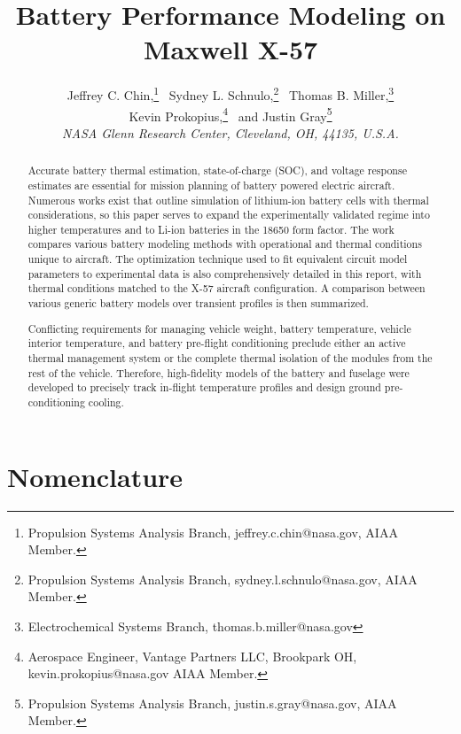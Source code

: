 \documentclass[]{aiaa-tc}%
\title{Battery Performance Modeling on Maxwell X-57}
\author{
  Jeffrey C. Chin,\thanks{Propulsion Systems Analysis Branch, jeffrey.c.chin@nasa.gov, AIAA Member.} \
  Sydney L. Schnulo,\thanks{Propulsion Systems Analysis Branch, sydney.l.schnulo@nasa.gov, AIAA Member.} \
  Thomas B. Miller,\thanks{Electrochemical Systems Branch, thomas.b.miller@nasa.gov} \\
  Kevin Prokopius,\thanks{Aerospace Engineer, Vantage Partners LLC, Brookpark OH, kevin.prokopius@nasa.gov AIAA Member.} \
  and Justin Gray\thanks{Propulsion Systems Analysis Branch, justin.s.gray@nasa.gov, AIAA Member.} \\
  {\normalsize \itshape NASA Glenn Research Center, Cleveland, OH, 44135, U.S.A.} }
\begin{document}
\maketitle

\begin{abstract}

Accurate battery thermal estimation, state-of-charge (SOC), and voltage response estimates are essential for mission planning of battery powered electric aircraft. Numerous works exist that outline simulation of lithium-ion battery cells with thermal considerations, so this paper serves to expand the experimentally validated regime into higher temperatures and to Li-ion batteries in the 18650 form factor. The work compares various battery modeling methods with operational and thermal conditions unique to aircraft. The optimization technique used to fit equivalent circuit model parameters to experimental data is also comprehensively detailed in this report, with thermal conditions matched to the X-57 aircraft configuration. A comparison between various generic battery models over transient profiles is then summarized.

Conflicting requirements for managing vehicle weight, battery temperature, vehicle interior temperature, and battery pre-flight conditioning preclude either an active thermal management system or the complete thermal isolation of the modules from the rest of the vehicle. Therefore, high-fidelity models of the battery and fuselage were developed to precisely track in-flight temperature profiles and design ground pre-conditioning cooling.

\end{abstract}


%
\section{Nomenclature}
\end{document}
